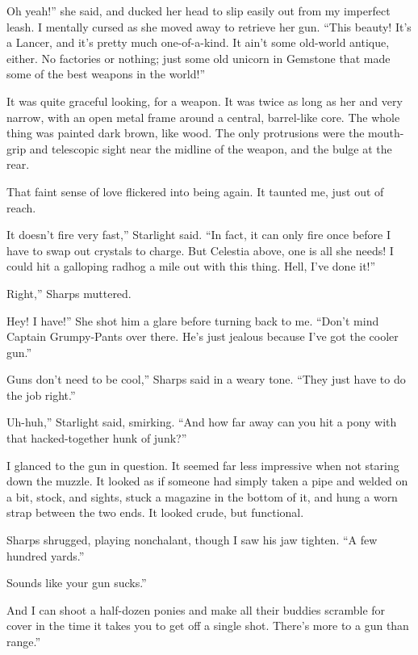\leavevmode{}Oh yeah!” she said, and ducked her head to slip easily out from my imperfect leash. I mentally cursed as she moved away to retrieve her gun. “This beauty! It’s a Lancer, and it’s pretty much one-of-a-kind. It ain’t some old-world antique, either. No factories or nothing; just some old unicorn in Gemstone that made some of the best weapons in the world!”

It was quite graceful looking, for a weapon. It was twice as long as her and very narrow, with an open metal frame around a central, barrel-like core. The whole thing was painted dark brown, like wood. The only protrusions were the mouth-grip and telescopic sight near the midline of the weapon, and the bulge at the rear.

That faint sense of love flickered into being again. It taunted me, just out of reach.

\leavevmode{}It doesn’t fire very fast,” Starlight said. “In fact, it can only fire once before I have to swap out crystals to charge. But Celestia above, one is all she needs! I could hit a galloping radhog a mile out with this thing. Hell, I’ve done it!”

\leavevmode{}Right,” Sharps muttered.

\leavevmode{}Hey! I have!” She shot him a glare before turning back to me. “Don’t mind Captain Grumpy-Pants over there. He’s just jealous because I’ve got the cooler gun.”

\leavevmode{}Guns don’t need to be cool,” Sharps said in a weary tone. “They just have to do the job right.”

\leavevmode{}Uh-huh,” Starlight said, smirking. “And how far away can you hit a pony with that hacked-together hunk of junk?”

I glanced to the gun in question. It seemed far less impressive when not staring down the muzzle. It looked as if someone had simply taken a pipe and welded on a bit, stock, and sights, stuck a magazine in the bottom of it, and hung a worn strap between the two ends. It looked crude, but functional.

Sharps shrugged, playing nonchalant, though I saw his jaw tighten. “A few hundred yards.”

\leavevmode{}Sounds like your gun sucks.”

\leavevmode{}And I can shoot a half-dozen ponies and make all their buddies scramble for cover in the time it takes you to get off a single shot. There’s more to a gun than range.”

